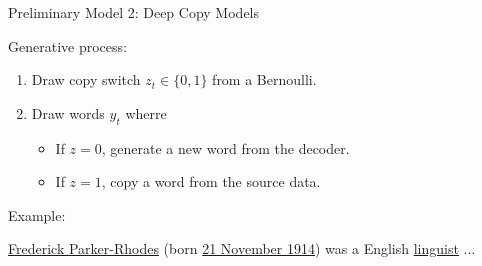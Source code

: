 



\begin{frame}{Preliminary Model 2: Deep Copy Models}

Generative process:
\begin{enumerate}
\item Draw copy switch $z_t \in \{0, 1\}$ from a Bernoulli.
\item Draw words $y_t$ wherre
\begin{itemize}
\item If $z = 0$, generate a new word from the decoder.
  \air 
\item If $z = 1$, copy a word from the source data.
\end{itemize}

\end{enumerate}

\air
\air

Example:
\begin{center}
\underline{Frederick Parker-Rhodes} (born \underline{21 November
1914}) was a English \underline{linguist} $\ldots$ 


\end{center}
\end{frame}


